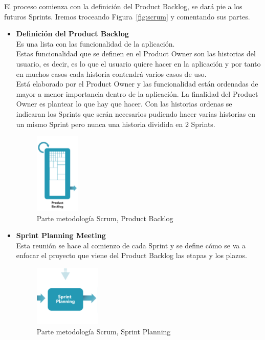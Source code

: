 El proceso comienza con la definición del Product Backlog, se dará pie a los futuros Sprints.
Iremos troceando Figura~\ref{fig:scrum} y comentando sus partes.
\begin{itemize}
\item \textbf{Definición del Product Backlog}\\
Es una lista con las funcionalidad de la aplicación.\\
Estas funcionalidad que se definen en el Product Owner son las historias del usuario, es decir, es lo que el usuario quiere hacer en la aplicación y por tanto en muchos casos cada historia contendrá varios casos de uso. \\
Está elaborado por el Product Owner y las funcionalidad están ordenadas de mayor a menor importancia dentro de la aplicación. La finalidad del Product Owner es plantear lo que hay que hacer.
Con las historias ordenas se indicaran los Sprints que serán necesarios pudiendo hacer  varias historias en un mismo Sprint pero nunca una historia dividida en 2 Sprints. 

 
 \begin{figure}[H]
		\centering
		\includegraphics[width=0.2\textwidth] {product.png}
		\caption{Parte metodología Scrum, Product Backlog }\label{fig:product}
	\end{figure} 


\item \textbf{Sprint Planning Meeting}\\
 Esta reunión se hace al comienzo de cada Sprint y se define cómo se va a enfocar el proyecto que viene del Product Backlog las etapas y los plazos.
\begin{figure}[H]
		\centering
		\includegraphics[width=0.3\textwidth] {planing.png}
		\caption{Parte metodología Scrum, Sprint Planning }\label{fig:planing}
	\end{figure} 


\end{itemize}
